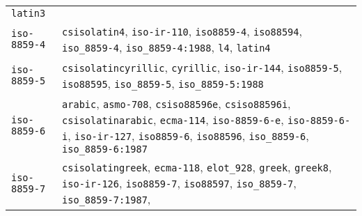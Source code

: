 \begin{longtable}[]{@{}
  >{\raggedright\arraybackslash}p{}
  >{\raggedright\arraybackslash}p{}@{}}
\texttt{\textquotesingle{}latin3\textquotesingle{}} \\
\texttt{\textquotesingle{}iso-8859-4\textquotesingle{}} &
\texttt{\textquotesingle{}csisolatin4\textquotesingle{}},
\texttt{\textquotesingle{}iso-ir-110\textquotesingle{}},
\texttt{\textquotesingle{}iso8859-4\textquotesingle{}},
\texttt{\textquotesingle{}iso88594\textquotesingle{}},
\texttt{\textquotesingle{}iso\_8859-4\textquotesingle{}},
\texttt{\textquotesingle{}iso\_8859-4:1988\textquotesingle{}},
\texttt{\textquotesingle{}l4\textquotesingle{}},
\texttt{\textquotesingle{}latin4\textquotesingle{}} \\
\texttt{\textquotesingle{}iso-8859-5\textquotesingle{}} &
\texttt{\textquotesingle{}csisolatincyrillic\textquotesingle{}},
\texttt{\textquotesingle{}cyrillic\textquotesingle{}},
\texttt{\textquotesingle{}iso-ir-144\textquotesingle{}},
\texttt{\textquotesingle{}iso8859-5\textquotesingle{}},
\texttt{\textquotesingle{}iso88595\textquotesingle{}},
\texttt{\textquotesingle{}iso\_8859-5\textquotesingle{}},
\texttt{\textquotesingle{}iso\_8859-5:1988\textquotesingle{}} \\
\texttt{\textquotesingle{}iso-8859-6\textquotesingle{}} &
\texttt{\textquotesingle{}arabic\textquotesingle{}},
\texttt{\textquotesingle{}asmo-708\textquotesingle{}},
\texttt{\textquotesingle{}csiso88596e\textquotesingle{}},
\texttt{\textquotesingle{}csiso88596i\textquotesingle{}},
\texttt{\textquotesingle{}csisolatinarabic\textquotesingle{}},
\texttt{\textquotesingle{}ecma-114\textquotesingle{}},
\texttt{\textquotesingle{}iso-8859-6-e\textquotesingle{}},
\texttt{\textquotesingle{}iso-8859-6-i\textquotesingle{}},
\texttt{\textquotesingle{}iso-ir-127\textquotesingle{}},
\texttt{\textquotesingle{}iso8859-6\textquotesingle{}},
\texttt{\textquotesingle{}iso88596\textquotesingle{}},
\texttt{\textquotesingle{}iso\_8859-6\textquotesingle{}},
\texttt{\textquotesingle{}iso\_8859-6:1987\textquotesingle{}} \\
\texttt{\textquotesingle{}iso-8859-7\textquotesingle{}} &
\texttt{\textquotesingle{}csisolatingreek\textquotesingle{}},
\texttt{\textquotesingle{}ecma-118\textquotesingle{}},
\texttt{\textquotesingle{}elot\_928\textquotesingle{}},
\texttt{\textquotesingle{}greek\textquotesingle{}},
\texttt{\textquotesingle{}greek8\textquotesingle{}},
\texttt{\textquotesingle{}iso-ir-126\textquotesingle{}},
\texttt{\textquotesingle{}iso8859-7\textquotesingle{}},
\texttt{\textquotesingle{}iso88597\textquotesingle{}},
\texttt{\textquotesingle{}iso\_8859-7\textquotesingle{}},
\texttt{\textquotesingle{}iso\_8859-7:1987\textquotesingle{}},

\end{longtable}
